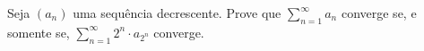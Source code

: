 Seja $(a_n)$ uma sequência decrescente.
Prove que $\sum_{n=1}^\infty a_n$ converge se, e somente se, $\sum_{n=1}^\infty 2^n \cdot a_{2^n}$ converge. 
